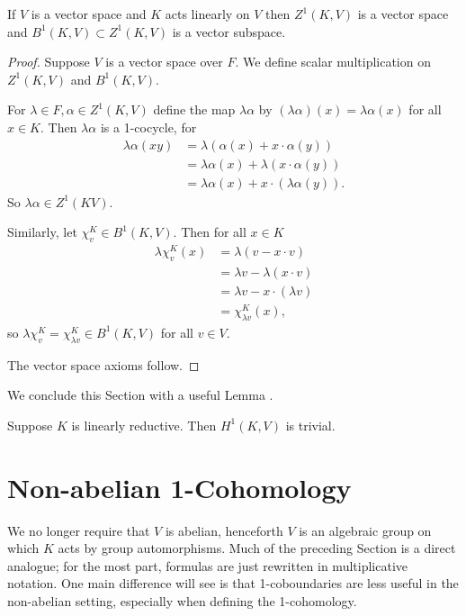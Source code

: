 \begin{lemma} \label{vspace} If $V$ is a vector space and $K$ acts linearly on $V$ then $Z^1(K, V)$ is a vector space and $B^1(K, V)\subset Z^1(K, V)$ is a vector subspace.
\end{lemma}
\begin{proof}
	Suppose $V$ is a vector space over $F$. We define scalar multiplication on $Z^1(K, V)$ and $B^1(K, V)$.

For $\lambda \in F, \alpha \in Z^1(K, V)$ define the map $\lambda\alpha$ by $(\lambda\alpha)(x) = \lambda\alpha(x)$ for all $x \in K$. Then $\lambda\alpha$ is a 1-cocycle, for
\begin{align*}
	\lambda \alpha(xy) &= \lambda\left( \alpha(x) + x \cdot \alpha(y)\right) \\
	&= \lambda\alpha(x) + \lambda(x\cdot \alpha(y)) \\
	&= \lambda\alpha(x) + x \cdot (\lambda\alpha(y)).
\end{align*}
So $\lambda\alpha \in Z^1(K V)$.

Similarly, let $\chi^K_v \in B^1(K, V)$. Then for all $x \in K$
\begin{align*}
	\lambda\chi^K_v(x) &= \lambda\left(v - x \cdot v\right) \\
		&= \lambda v - \lambda(x \cdot v) \\
		&= \lambda v - x \cdot (\lambda v) \\
		&= \chi^K_{\lambda v}(x),
\end{align*}
so $\lambda\chi^K_v = \chi^K_{\lambda v} \in B^1(K, V)$ for all $v \in V$.

The vector space axioms follow.
\end{proof}

We conclude this Section with a useful Lemma \cite[Proposition 1]{kemper2000characterization}.
\begin{lemma} Suppose $K$ is linearly reductive. Then $H^1(K, V)$ is trivial.
  \label{lem:lin_red_h}
\end{lemma}

\section{Non-abelian 1-Cohomology}
	
We no longer require that $V$ is abelian, henceforth $V$ is an algebraic group on which $K$ acts by group automorphisms. Much of the preceding Section is a direct analogue; for the most part, formulas are just rewritten in multiplicative notation.
One main difference will see is that 1-coboundaries are less useful in the non-abelian setting, especially when defining the 1-cohomology.

